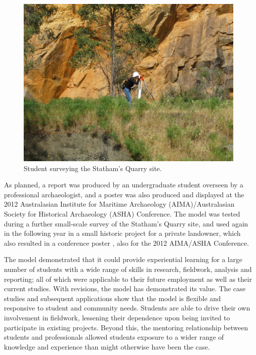 \documentclass{ijsra}
\begin{document}
   	\begin{figure} %
   		\includegraphics[width=\linewidth]{figures/Fyfe-Figure03}
   		\caption{Student surveying the Statham's Quarry site.}
   		\centering
   		\label{fig:Fyfe-Figure03}
   	\end{figure}

As planned, a report \parencite{murszewskiwinter2012} was produced by an undergraduate student overseen by a professional archaeologist, 
and a poster \parencite{murszewski2012} was also produced and displayed at the 2012 Australasian Institute for Maritime Archaeology (AIMA)/Australasian Society for Historical Archaeology (ASHA) Conference. 
The model was tested during a further small-scale survey of the Statham’s Quarry site, and used again in the following year in a small historic project for a private landowner, which also resulted in a conference poster \parencite{busher2012}, also for the 2012 AIMA/ASHA Conference.

The model demonstrated that it could provide experiential learning for a large number of students with a wide range of skills in research, fieldwork, analysis and reporting; all of which were applicable to their future employment as well as their current studies. 
With revisions, the model has demonstrated its value. The case studies and subsequent applications show that the model is flexible and responsive to student and community needs. 
Students are able to drive their own involvement in fieldwork, lessening their dependence upon being invited to participate in existing projects. Beyond this, the mentoring relationship between students and professionals allowed students exposure to a wider range of knowledge and experience than might otherwise have been the case.
\end{document}
